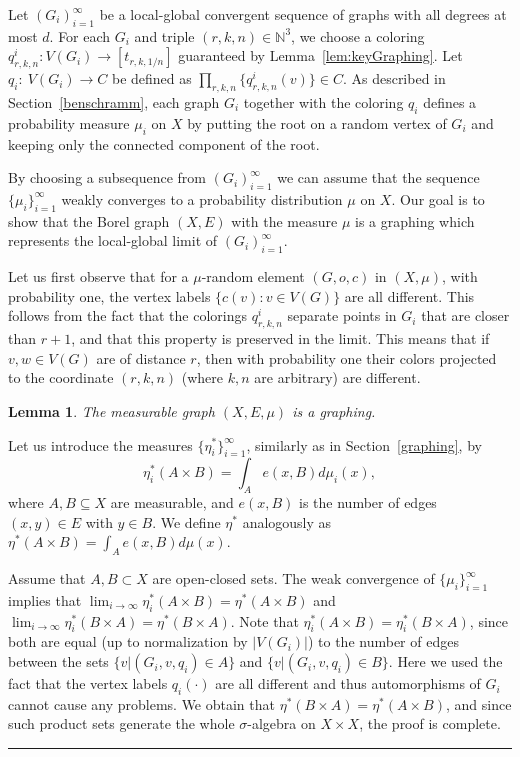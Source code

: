 \documentclass{article}
\newtheorem{lemma}[theorem]{Lemma}
\newenvironment{proof}{{\bf Proof.}}{\hfill\rule{2mm}{2mm}\medskip}
\begin{document}
Let $(G_i)_{i=1}^\infty$ be a local-global  convergent sequence of
graphs with all degrees at most $d$. For each $G_i$ and triple
$(r,k,n)\in\mathbb{N}^3$, we choose a coloring
$q^i_{r,k,n}:V(G_i)\rightarrow [t_{r,k,1/n}]$ guaranteed by
Lemma~\ref{lem:keyGraphing}. Let $q_i:~V(G_i)\rightarrow C$ be
defined as $\prod_{r,k,n}\{q^i_{r,k,n}(v)\}\in C$. As described in
Section~\ref{benschramm}, each graph $G_i$ together with the coloring
$q_i$ defines a probability measure $\mu_i$ on $X$ by putting the
root on a random vertex of $G_i$ and keeping only the connected
component of the root.

By choosing a subsequence from $(G_i)_{i=1}^\infty$ we can assume
that the sequence $\{\mu_i\}_{i=1}^\infty$ weakly converges to a
probability distribution $\mu$ on $X$. Our goal is to show that the
Borel graph $(X,E)$ with the measure $\mu$ is a graphing which
represents the local-global limit of $(G_i)_{i=1}^\infty$.

Let us first observe that for a $\mu$-random element $(G,o,c)$ in
$(X,\mu)$, with probability one, the vertex labels $\{c(v) : v \in
V(G)\}$ are all different. This follows from the fact that the
colorings $q^i_{r,k,n}$ separate points in $G_i$ that are closer than
$r+1$, and that this property is preserved in the limit. This means
that if $v,w\in V(G)$ are of distance $r$, then with probability one
their colors projected to the coordinate $(r,k,n)$ (where $k,n$ are
arbitrary) are different.

\begin{lemma}
The measurable graph $(X,E,\mu)$ is a graphing.
\end{lemma}
%
\begin{proof}
Let us introduce the measures $\{\eta_i^*\}_{i=1}^\infty$, similarly
as in Section~\ref{graphing}, by
\[
\eta_i^*(A\times B)=\int_A e(x,B) d\mu_i(x),
\]
where $A,B\subseteq X$ are measurable, and $e(x,B)$ is the number of
edges $(x,y)\in E$ with $y\in B$. We define $\eta^*$ analogously as
$\eta^*(A\times B)=\int_A e(x,B) d\mu(x)$.

Assume that $A,B\subset X$ are open-closed sets. The weak convergence
of $\{\mu_i\}_{i=1}^\infty$ implies that
$\lim_{i\to\infty}\eta_i^*(A\times B)=\eta^*(A\times B)$ and
$\lim_{i\to\infty}\eta_i^*(B\times A)=\eta^*(B\times A)$. Note that
$\eta^*_i(A\times B)=\eta^*_i(B\times A)$, since both are equal (up
to normalization by $|V(G_i)|$) to the number of edges between the
sets $\{v|(G_i,v,q_i)\in A\}$ and $\{v|(G_i,v,q_i)\in B\}$. Here we
used the fact that the vertex labels $q_i(\cdot)$ are all different
and thus automorphisms of $G_i$ cannot cause any problems. We obtain
that $\eta^*(B\times A)=\eta^*(A\times B)$, and since such product
sets generate the whole $\sigma$-algebra on $X\times X$, the proof is
complete.
\end{proof}
\end{document}
